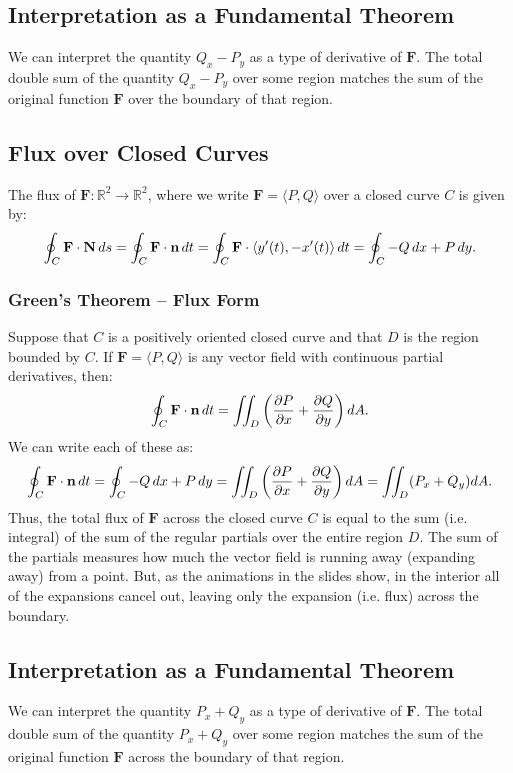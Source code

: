 \subsection{Interpretation as a Fundamental Theorem}

We can interpret the quantity \(Q_x - P_y\) as a type of derivative of \(\mathbf{F}\). The total double sum of the quantity \(Q_x - P_y\) over some region matches the sum of the original function \(\mathbf{F}\) over the boundary of that region. \\

\subsection{Flux over Closed Curves}

The flux of \(\mathbf{F} : \mathbb{R}^2 \to \mathbb{R}^2\), where we write \(\mathbf{F} = \langle P,Q \rangle\) over a closed curve \(C\) is given by:
\[
    \oint_C \mathbf{F} \cdot \mathbf{N} \, ds = \oint_C \mathbf{F} \cdot \mathbf{n} \, dt = \oint_C \mathbf{F} \cdot \langle y'(t), -x'(t) \rangle \, dt = \oint_C -Q \, dx + P \, dy.
\]

\subsubsection{Green's Theorem – Flux Form}

Suppose that \(C\) is a positively oriented closed curve and that \(D\) is the region bounded by \(C\). If \(\mathbf{F} = \langle P,Q \rangle\) is any vector field with continuous partial derivatives, then:
\[
    \oint_C \mathbf{F} \cdot \mathbf{n} \, dt = \iint_D \left( \frac{\partial P}{\partial x} + \frac{\partial Q}{\partial y} \right) dA.
\]
We can write each of these as:
\[
    \oint_C \mathbf{F} \cdot \mathbf{n} \, dt = \oint_C -Q \, dx + P \, dy = \iint_D \left( \frac{\partial P}{\partial x} + \frac{\partial Q}{\partial y} \right) dA = \iint_D (P_x + Q_y) dA.
\]
Thus, the total flux of \(\mathbf{F}\) across the closed curve \(C\) is equal to the sum (i.e. integral) of the sum of the regular partials over the entire region \(D\). The sum of the partials measures how much the vector field is running away (expanding away) from a point. But, as the animations in the slides show, in the interior all of the expansions cancel out, leaving only the expansion (i.e. flux) across the boundary.

\subsection{Interpretation as a Fundamental Theorem}

We can interpret the quantity \(P_x + Q_y\) as a type of derivative of \(\mathbf{F}\). The total double sum of the quantity \(P_x + Q_y\) over some region matches the sum of the original function \(\mathbf{F}\) across the boundary of that region.
